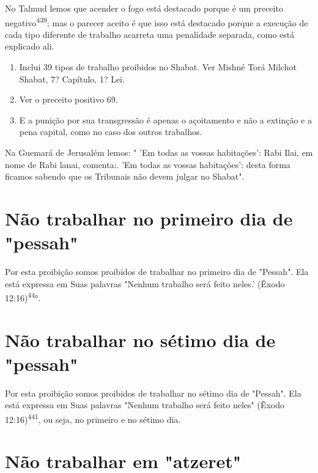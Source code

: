 \begin{itemize}
\begin{enumrate}
\begin{itemize}
\begin{itemize}
\begin{itemize}
No Talmud lemos que acender o fogo está destacado porque é um preceito
negativo\textsuperscript{439}; mas o parecer aceito é que isso está
destacado porque a execução de cada tipo diferente de trabalho acarreta
uma penalidade separada, como está explicado ali.


\begin{enumerate}
\def\labelenumi{\arabic{enumi}.}
\setcounter{enumi}{436}
\item
 
 Inclui 39 tipos de trabalho proibidos no Shabat. Ver Mishné Torá
 Milchot Shabat, 7? Capítu­lo, 1? Lei.
 
\item
 
 Ver o preceito positivo 69.
 
\item
 
 E a punição por sua transgressão é apenas o açoitamento e não a
 extinção e a pena capital, como no caso dos outros trabalhos.
 
\end{enumerate}


Na Guemará de Jerusalém lemos: " 'Em todas as vossas habitações': Rabi
Ilai, em nome de Rabi lanai, comenta:. 'Em todas as vossas habitações':
desta forma ficamos sabendo que os Tribunais não devem julgar no
Shabat".

\section{Não trabalhar no primeiro dia de "pessah"}

Por esta proibição somos proibidos de trabalhar no primeiro dia de
"Pessah". Ela está expressa em Suas palavras "Nenhum trabalho será feito
ne­les.' (Êxodo 12:16)\textsuperscript{44}°.

\section{Não trabalhar no sétimo dia de "pessah"}

Por esta proibição somos proibidos de trabalhar no sétimo dia de
"Pessah". Ela está expressa em Suas palavras "Nenhum trabalho será feito
ne­les" (Êxodo 12:16)\textsuperscript{441}, ou seja, no primeiro e no
sétimo dia.

\section{Não trabalhar em "atzeret"}


\end{itemize}
\end{itemize}
\end{itemize}
\end{enumrate}
\end{itemize}
